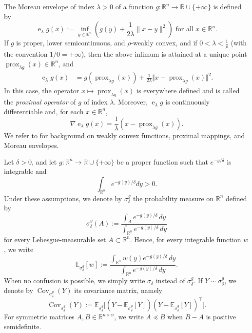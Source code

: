 \documentclass[11pt]{article}
\newcommand{\1}{\mathds{1}}
\theoremstyle{definition}
\theoremstyle{remark}
\theoremstyle{definition}
\newcommand{\R}{\mathbb{R}}
\newcommand{\E}{\mathbb{E}}
\newcommand{\MoreauYosida}[2]{\operatorname{e}_{#2} #1}
\begin{document}
The Moreau envelope of index $\lambda>0$ of a function $g\colon \R^n\to \mathbb{R}\cup \{+\infty\}$ is   defined by 
\begin{equation*}
    \MoreauYosida{g}{\lambda}(x):=\inf_{y\in \mathbb{R}^n} \left(	g(y) + \frac{1}{2\lambda } \|  x - y\|^2		\right) \textrm{ for all } x\in \mathbb{R}^n.
\end{equation*}
 If $g$ is proper, lower semicontinuous, and $\rho$-weakly convex, and if $0<\lambda<\frac{1}{\rho}$ (with the convention $1/0=+\infty$), then the above infimum is attained at a unique point $\operatorname{prox}_{\lambda g}(x)\in \mathbb{R}^n$, and
\begin{equation*}
\begin{aligned}
\MoreauYosida{g}{\lambda}(x)&=g(\operatorname{prox}_{\lambda g}(x))+\frac{1}{2\lambda}\Vert x-\operatorname{prox}_{\lambda g}(x)\Vert^2.
\end{aligned}
\end{equation*}
In this case, the operator $x\mapsto \operatorname{prox}_{\lambda g}(x)$ is everywhere defined and is called the \emph{proximal operator} of $g$ of index $\lambda$. Moreover, $\MoreauYosida{g}{\lambda}$ is continuously differentiable and, for each  $x\in \mathbb{R}^n$, 
\begin{equation*}
\nabla \MoreauYosida{g}{\lambda}(x)=\frac{1}{\lambda}(x-\operatorname{prox}_{\lambda g}(x)).
\end{equation*}
We refer to \cite{MR3288271,MR3616647} for background on weakly convex functions, proximal mappings, and Moreau envelopes.


Let $\delta>0$, and let $g\colon \mathbb{R}^n \to \mathbb{R}\cup \{+\infty\}$ be a proper function such that $e^{-g/\delta}$ is integrable and
$$
\int_{\mathbb{R}^n}e^{-g(y)/\delta}dy>0.
$$
Under these assumptions, we denote by \(\sigma_\delta^g\) the
probability measure on \(\R^n\) defined by
\[
\sigma_\delta^g(A)
:=
\frac{\displaystyle\int_A e^{-g(y)/\delta}\,dy}
{\displaystyle\int_{\R^n} e^{-g(y)/\delta}\,dy}
\]
for every Lebesgue-measurable set \(A\subset\R^n\). Hence, for every integrable
function \(w\), we write
\[
\E_{\sigma_\delta^g}[w]
:=
\frac{\displaystyle\int_{\R^n} w(y)e^{-g(y)/\delta}\,dy}
{\displaystyle\int_{\R^n} e^{-g(y)/\delta}\,dy}.
\]
When no confusion is possible, we simply write \(\sigma_\delta\) instead
of \(\sigma_\delta^g\). If \(Y\sim \sigma_\delta^g\), we denote by
\(\operatorname{Cov}_{\sigma_\delta^g}(Y)\) its covariance matrix,
namely
\[
\operatorname{Cov}_{\sigma_\delta^g}(Y)
:=
\E_{\sigma_\delta^g}
\bigl[(Y-\E_{\sigma_\delta^g}[Y])
(Y-\E_{\sigma_\delta^g}[Y])^\top\bigr].
\]
For symmetric matrices \(A,B\in\R^{n\times n}\), we write $A\preceq B$ when \(B-A\) is positive semidefinite.
\end{document}
